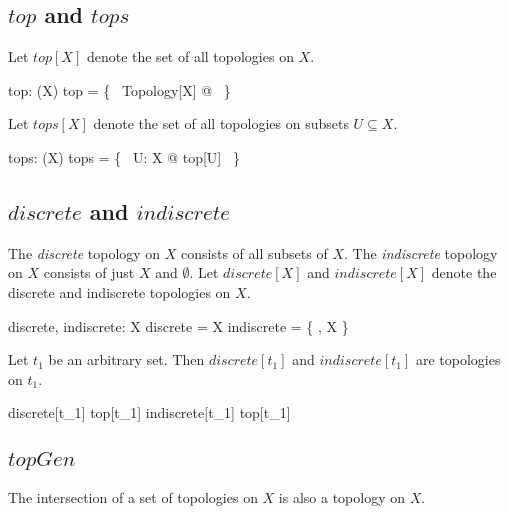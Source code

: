 \documentclass[11pt, oneside]{article}
\begin{document}
\subsection{$top$ and $tops$}

Let $top[X]$ denote the set of all topologies on $X$.

\begin{gendef}[X]
	top: \power(\family X)
\where
	top = \{~ Topology[X] @ \tau ~\}
\end{gendef}

Let $tops[X]$ denote the set of all topologies on subsets $U \subseteq X$.

\begin{gendef}[X]
	tops: \power(\family X)
\where
	tops = \bigcup \{~ U: \power X @ top[U] ~\}
\end{gendef}

\subsection{$discrete$ and $indiscrete$}

The {\it discrete} topology on $X$ consists of all subsets of $X$.
The {\it indiscrete} topology on $X$ consists of just $X$ and $\emptyset$.
Let $discrete[X]$ and $indiscrete[X]$ denote the discrete and indiscrete topologies on $X$.

\begin{gendef}[X]
	discrete, indiscrete: \family X
\where
	discrete = \power X
\also
	indiscrete =  \{ \emptyset, X \}
\end{gendef}

\begin{example}
Let $t_1$ be an arbitrary set.
Then $discrete[t_1]$ and $indiscrete[t_1]$ are topologies on $t_1$.

\begin{zed}
	discrete[t_1] \in top[t_1] 
\also
	indiscrete[t_1] \in top[t_1]
\end{zed}

\end{example}

\subsection{$topGen$}

\begin{remark}

The intersection of a set of topologies on $X$ is also a topology on $X$.

\end{remark}
\end{document}
